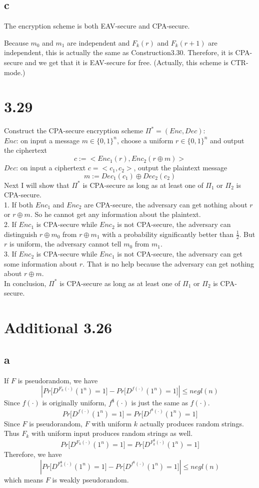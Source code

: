 \documentclass[a4papers]{ctexart}
\begin{document}
\subsection*{c}
The encryption scheme is both EAV-secure and CPA-secure.

Because $m_0$ and $m_1$ are independent and $F_k(r)$ and $F_k(r+1)$ are independent, this is actually the same as Construction3.30. 
Therefore, it is CPA-secure and we get that it is EAV-secure for free. (Actually, this scheme is CTR-mode.)

\section*{3.29}
\noindent Construct the CPA-secure encryption scheme $\Pi^*=(Enc,Dec)$:\\
$Enc$: on input a message $m \in \{0,1\}^n$, choose a uniform $r\in \{0,1\}^n$ and output the ciphertext
\[ c:= <Enc_1(r),Enc_2(r\oplus m)>\]
$Dec$: on input a ciphertext $c = <c_1,c_2>$, output the plaintext message
\[m:=Dec_1(c_1) \oplus Dec_2(c_2)\]
Next I will show that $\Pi^*$ is CPA-secure as long as at least one of $\Pi_1$ or $\Pi_2$ is CPA-secure.\\
1. If both $Enc_1$ and $Enc_2$ are CPA-secure, the adversary can get nothing about $r$ or $r\oplus m$. So he cannot 
get any information about the plaintext.\\
2. If $Enc_1$ is CPA-secure while $Enc_2$ is not CPA-secure, the adversary can distinguish $r\oplus m_0$ from $r\oplus m_1$ with a probability significantly better than $\frac{1}{2}$.
But $r$ is uniform, the adversary cannot tell $m_0$ from $m_1$.\\
3. If $Enc_2$ is CPA-secure while $Enc_1$ is not CPA-secure, the adversary can get some information about $r$.
That is no help because the adversary can get nothing about $r\oplus m$.\\
In conclusion, $\Pi^*$ is CPA-secure as long as at least one of $\Pi_1$ or $\Pi_2$ is CPA-secure.\\

\section*{Additional 3.26}
\subsection*{a}
\noindent If $F$ is pseudorandom, we have
 \[|Pr\big[ D^{F_k(·)}(1^n)=1\big] - Pr\big[ D^{f(·)}(1^n)=1\big]| \le negl(n)\]
 Since $f(·)$ is originally uniform, $f^\$(·)$ is just the same as $f(·)$.
 \[Pr\big[ D^{f(·)}(1^n)=1\big] = Pr\big[ D^{f^\$(·)}(1^n)=1\big]\]
Since $F$ is pseudorandom, $F$ with uniform $k$ actually produces random strings. Thus $F_k$ with uniform input produces random strings as well.
\[Pr\big[ D^{F_k(·)}(1^n)=1\big] = Pr\big[ D^{F^\$_k(·)}(1^n)=1\big]\]
Therefore, we have 
 \[|Pr\big[ D^{F^\$_k(·)}(1^n)=1\big] - Pr\big[ D^{f^\$(·)}(1^n)=1\big]| \le negl(n)\]
 which means $F$ is weakly pseudorandom.
\end{document}
